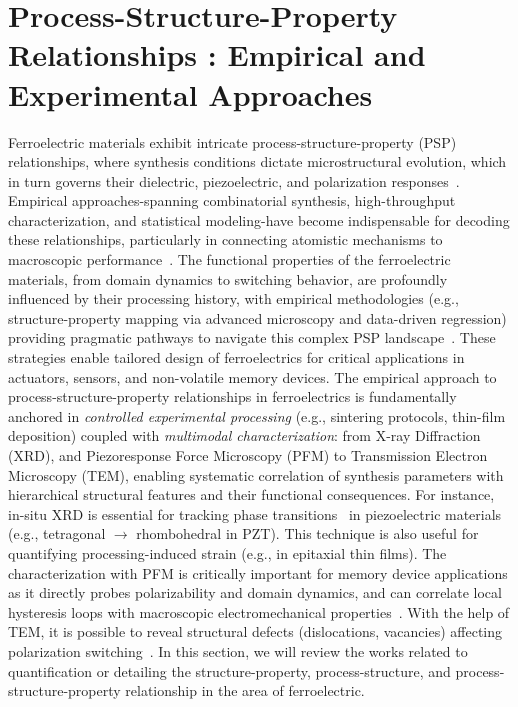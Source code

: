 \documentclass[a4paper,fleqn]{cas-sc}
\begin{document}
\section{Process-Structure-Property Relationships : Empirical and Experimental Approaches} \label{experimental_descriptions}
Ferroelectric materials exhibit intricate process-structure-property (PSP) relationships, where synthesis conditions dictate microstructural evolution, which in turn governs their dielectric, piezoelectric, and polarization responses~\cite{SCHULTHEI2023101101}. Empirical approaches-spanning combinatorial synthesis, high-throughput characterization, and statistical modeling-have become indispensable for decoding these relationships, particularly in connecting atomistic mechanisms to macroscopic performance~\cite{JIA2025116162}. The functional properties of the ferroelectric materials, from domain dynamics to switching behavior, are profoundly influenced by their processing history, with empirical methodologies (e.g., structure-property mapping via advanced microscopy and data-driven regression) providing pragmatic pathways to navigate this complex PSP landscape~\cite{PhysRevB.108.024305}. These strategies enable tailored design of ferroelectrics for critical applications in actuators, sensors, and non-volatile memory devices. The empirical approach to process-structure-property relationships in ferroelectrics is fundamentally anchored in \textit{controlled experimental processing} (e.g., sintering protocols, thin-film deposition) coupled with \textit{multimodal characterization}: from X-ray Diffraction (XRD),  and Piezoresponse Force Microscopy (PFM) to Transmission Electron Microscopy (TEM), enabling systematic correlation of synthesis parameters with hierarchical structural features and their functional consequences. For instance, in-situ XRD is essential for tracking phase transitions~\cite{Liu2005-JACS} in piezoelectric materials (e.g., tetragonal $\rightarrow$ rhombohedral in PZT). This technique is also useful for quantifying processing-induced strain (e.g., in epitaxial thin films). The characterization with PFM is critically important for memory device applications as it directly probes polarizability and domain dynamics, and can correlate local hysteresis loops with macroscopic electromechanical properties~\cite{Gruverman2019-NC}. With the help of TEM, it is possible to reveal structural defects (dislocations, vacancies) affecting polarization switching~\cite{WINKLER20121121,Gao2011-NC,BRITSON2016285,Hirel2015-PhysRevB.92.214101,Kalinin2010-AM}. In this section, we will review the works related to quantification or detailing the structure-property, process-structure, and process-structure-property relationship in the area of ferroelectric. 
\end{document}
